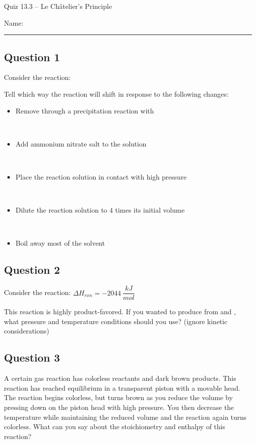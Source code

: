 \documentclass[11pt, letterpaper]{memoir}
\begin{document}
	\begin{center}
		{\large	Quiz 13.3 -- Le Ch\^atelier's Principle}
	\end{center}
	{\large Name: \rule[-1mm]{4in}{.1pt} 
	
	\subsection*{Question 1}
	Consider the reaction: 
	
	\noindent Tell which way the reaction will shift in response to the following changes:
	\begin{itemize}
		\item Remove  through a precipitation reaction with 
		
		~
		\item Add ammonium nitrate salt to the solution
		
		~
		\item Place the reaction solution in contact with high pressure 
		
		~
		\item Dilute the reaction solution to $4$ times its initial volume
		
		~
		\item Boil away most of the solvent
	\end{itemize}
	
	\vspace{1em}
	\subsection*{Question 2}
	Consider the reaction:  \hspace{1em} $\Delta H_{rxn}=-2044~\dfrac{kJ}{mol}$
	
	\noindent This reaction is highly product-favored. If you wanted to produce  from  and , what pressure and temperature conditions should you use? (ignore kinetic considerations)
	
	\vspace{4em}
	\subsection*{Question 3}
	A certain gas reaction has colorless reactants and dark brown products. This reaction has reached equilibrium in a transparent piston with a movable head. The reaction begins colorless, but turns brown as you reduce the volume by pressing down on the piston head with high pressure. You then decrease the temperature while maintaining the reduced volume and the reaction again turns colorless. What can you say about the stoichiometry and enthalpy of this reaction?
		
}
\end{document}
